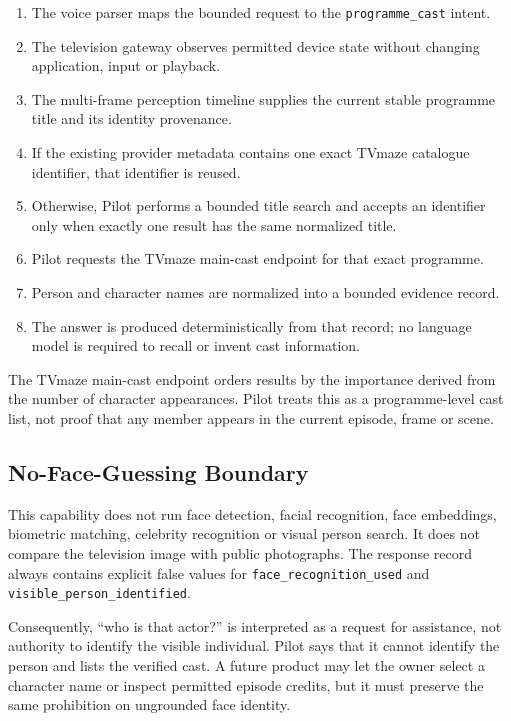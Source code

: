 \begin{enumerate}
  \item The voice parser maps the bounded request to the
        \texttt{programme\_cast} intent.
  \item The television gateway observes permitted device state without changing
        application, input or playback.
  \item The multi-frame perception timeline supplies the current stable programme
        title and its identity provenance.
  \item If the existing provider metadata contains one exact TVmaze catalogue
        identifier, that identifier is reused.
  \item Otherwise, Pilot performs a bounded title search and accepts an identifier
        only when exactly one result has the same normalized title.
  \item Pilot requests the TVmaze main-cast endpoint for that exact programme.
  \item Person and character names are normalized into a bounded evidence record.
  \item The answer is produced deterministically from that record; no language
        model is required to recall or invent cast information.
\end{enumerate}

The TVmaze main-cast endpoint orders results by the importance derived from the
number of character appearances. Pilot treats this as a programme-level cast list,
not proof that any member appears in the current episode, frame or scene.

\subsection{No-Face-Guessing Boundary}

This capability does not run face detection, facial recognition, face embeddings,
biometric matching, celebrity recognition or visual person search. It does not
compare the television image with public photographs. The response record always
contains explicit false values for \texttt{face\_recognition\_used} and
\texttt{visible\_person\_identified}.

Consequently, ``who is that actor?'' is interpreted as a request for assistance,
not authority to identify the visible individual. Pilot says that it cannot identify
the person and lists the verified cast. A future product may let the owner select a
character name or inspect permitted episode credits, but it must preserve the same
prohibition on ungrounded face identity.

